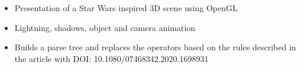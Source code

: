\begin{footnotesize}
\end{footnotesize}


\divider






\begin{itemize}

\item Presentation of a Star Wars inspired 3D scene using OpenGL

\item Lightning, shadows, object and camera animation

\end{itemize}

\begin{footnotesize}
\end{footnotesize}


\divider





\begin{itemize}

\item Builds a parse tree and replaces the operators based on the rules described in the article with DOI: 10.1080/07468342.2020.1698931

\end{itemize}

\begin{footnotesize}
\end{footnotesize}


\divider






% 
% 
% 
% 
% 
% 
% 
% 
% 


